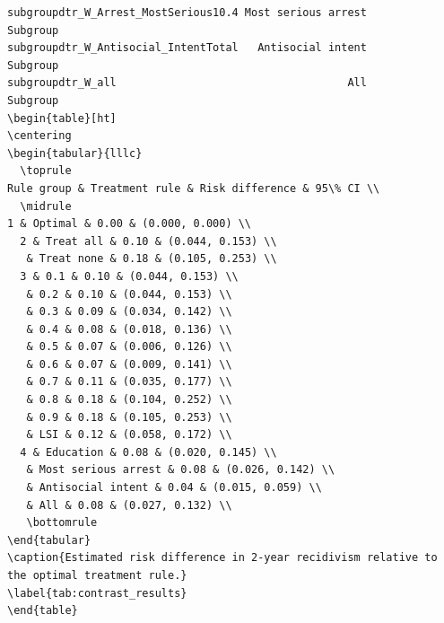 \documentclass[11pt]{article}\usepackage[]{graphicx}\usepackage[]{xcolor}
\makeatletter
\newenvironment{kframe}{%
 \def\at@end@of@kframe{}%
 \ifinner\ifhmode%
  \def\at@end@of@kframe{\end{minipage}}%
  \begin{minipage}{\columnwidth}%
 \fi\fi%
 \def\FrameCommand##1{\hskip\@totalleftmargin \hskip-\fboxsep
 \colorbox{shadecolor}{##1}\hskip-\fboxsep
     \hskip-\linewidth \hskip-\@totalleftmargin \hskip\columnwidth}%
 \MakeFramed {\advance\hsize-\width
   \@totalleftmargin\z@ \linewidth\hsize
   \@setminipage}}%
 {\par\unskip\endMakeFramed%
 \at@end@of@kframe}
\newenvironment{knitrout}{}{} %
\makeatother
\begin{document}
\begin{knitrout}
\begin{kframe}
\begin{verbatim}
subgroupdtr_W_Arrest_MostSerious10.4 Most serious arrest            Subgroup
subgroupdtr_W_Antisocial_IntentTotal   Antisocial intent            Subgroup
subgroupdtr_W_all                                    All            Subgroup
\begin{table}[ht]
\centering
\begin{tabular}{lllc}
  \toprule
Rule group & Treatment rule & Risk difference & 95\% CI \\ 
  \midrule
1 & Optimal & 0.00 & (0.000, 0.000) \\ 
  2 & Treat all & 0.10 & (0.044, 0.153) \\ 
   & Treat none & 0.18 & (0.105, 0.253) \\ 
  3 & 0.1 & 0.10 & (0.044, 0.153) \\ 
   & 0.2 & 0.10 & (0.044, 0.153) \\ 
   & 0.3 & 0.09 & (0.034, 0.142) \\ 
   & 0.4 & 0.08 & (0.018, 0.136) \\ 
   & 0.5 & 0.07 & (0.006, 0.126) \\ 
   & 0.6 & 0.07 & (0.009, 0.141) \\ 
   & 0.7 & 0.11 & (0.035, 0.177) \\ 
   & 0.8 & 0.18 & (0.104, 0.252) \\ 
   & 0.9 & 0.18 & (0.105, 0.253) \\ 
   & LSI & 0.12 & (0.058, 0.172) \\ 
  4 & Education & 0.08 & (0.020, 0.145) \\ 
   & Most serious arrest & 0.08 & (0.026, 0.142) \\ 
   & Antisocial intent & 0.04 & (0.015, 0.059) \\ 
   & All & 0.08 & (0.027, 0.132) \\ 
   \bottomrule
\end{tabular}
\caption{Estimated risk difference in 2-year recidivism relative to the optimal treatment rule.} 
\label{tab:contrast_results}
\end{table}
\end{verbatim}
\end{kframe}
\end{knitrout}
\end{document}
